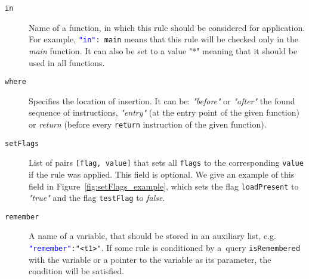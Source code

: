 \begin{description}
    \item[\texttt{in}] Name of a function, in which this rule should be
    considered for application. For example, \texttt{\textcolor{blue}{"in"}:
    main} means that this rule will be checked only in the \emph{main}
    function. It can also be set to a value "*" meaning that it should be used
    in all functions.

    \item[\texttt{where}] Specifies the location of insertion. It can be:
    \emph{"before"} or \emph{"after"} the found sequence of instructions,
    \emph{"entry"} (at the entry point of the given function) or \emph{return}
    (before every \texttt{return} instruction of the given function).

    \item[\texttt{setFlags}] List of pairs \texttt{[flag, value]} that sets all
    \texttt{flags} to the corresponding \texttt{value} if the rule was applied.
    This field is optional. We give an example of this field in
    Figure~\ref{fig:setFlags_example}, which sets the flag \texttt{loadPresent}
    to \emph{"true"} and the flag \texttt{testFlag} to \emph{false}.

     \begin{minipage}{\linewidth}
        
        \label{fig:setFlags_example}
      \end{minipage}

    \item[\texttt{remember}] A name of a variable, that should be stored in an
    auxiliary list, e.g. \texttt{\textcolor{blue}{"remember"}:"<t1>"}. If some
    rule is conditioned by a~query \texttt{isRemembered} with the variable or a
    pointer to the variable as its parameter, the condition will be satisfied.
\end{description}

\medskip


